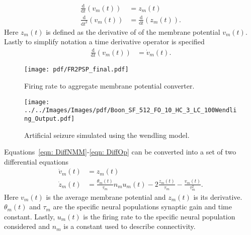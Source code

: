 \begin{align}
\label{eqn: dummy1}
\frac{\mathrm{d}}{\mathrm{d}t}(v_{m}(t)) &= z_{m}(t)\\
\label{eqn: dummy2}
\frac{\mathrm{d}}{\mathrm{d}t^2}(v_{m}(t)) &= \frac{\mathrm{d}}{\mathrm{d}t}(z_{m}(t)).\end{align} Here $z_{m}(t)$ is defined as the derivative of of the membrane potential $v_{m}(t)$. Lastly to simplify notation a time derivative operator is specified \begin{align}%
\label{eqn: DiffOp}
\frac{\mathrm{d}}{\mathrm{d}t}(v_{m}(t)) &= \dot{v}_{m}(t).
\end{align} %
\begin{figure}%
	\centering
		\texttt{[image: pdf/FR2PSP\_final.pdf]}
	\caption{Firing rate to aggregate membrane potential converter.}
	\label{fig: FR2PSP_final}
\end{figure} 
\begin{figure}%
	\centering
		\texttt{[image: ../../Images/Images/pdf/Boon\_SF\_512\_FO\_10\_HC\_3\_LC\_100Wendling\_Output.pdf]}
	\caption{Artificial seizure simulated using the wendling model.}
	\label{fig: SeizureSim}
\end{figure}%
Equations~\ref{eqn: DiffNMM}-\ref{eqn: DiffOp} can be converted into a set of two differential equations \begin{align}%
\label{eqn: FR2PSP1}
\dot{v}_{m}(t)&= z_{m}(t)\\
\label{eqn: FR2PSP2}
\dot{z}_{m}(t)&=\frac{\theta_{m}(t)}{\tau_{m}}n_{m}u_{m}(t)-2\frac{z_{m}(t)}{\tau_{m}}-\frac{v_{m}(t)}{\tau_{m}^{2}}.
\end{align} Here $v_{m}(t)$ is the average membrane potential and $z_{m}(t)$ is its derivative. $\theta_{m}(t)$ and $\tau_{m}$ are the specific neural populations synaptic gain and time constant. Lastly, $u_{m}(t)$ is the firing rate to the specific neural population considered and $n_{m}$ is a constant used to describe connectivity.

